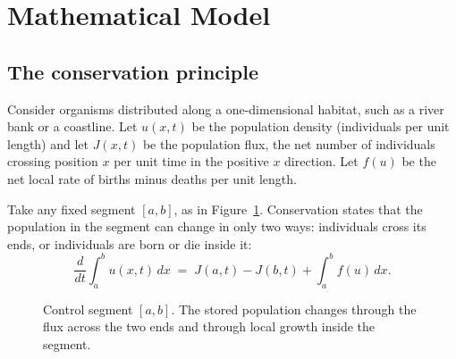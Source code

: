 \documentclass[11pt,a4paper]{article}
\begin{document}
\section{Mathematical Model}\label{sec:model}

\subsection{The conservation principle}
Consider organisms distributed along a one-dimensional habitat, such as a river bank or a coastline.
Let $u(x,t)$ be the population density (individuals per unit length) and let $J(x,t)$ be the
population flux, the net number of individuals crossing position $x$ per unit time in the positive
$x$ direction. Let $f(u)$ be the net local rate of births minus deaths per unit length.

Take any fixed segment $[a,b]$, as in Figure~\ref{fig:controlvolume}. Conservation states that
the population in the segment can change in only two ways: individuals cross its ends, or
individuals are born or die inside it:
\begin{equation}
  \frac{d}{dt}\int_a^b u(x,t)\,dx \;=\; J(a,t)-J(b,t)+\int_a^b f(u)\,dx .
  \label{eq:integral}
\end{equation}

\begin{figure}[H]
\centering
{}
\caption{Control segment $[a,b]$. The stored population changes through the flux across the two
ends and through local growth inside the segment.}
\label{fig:controlvolume}
\end{figure}
\end{document}
